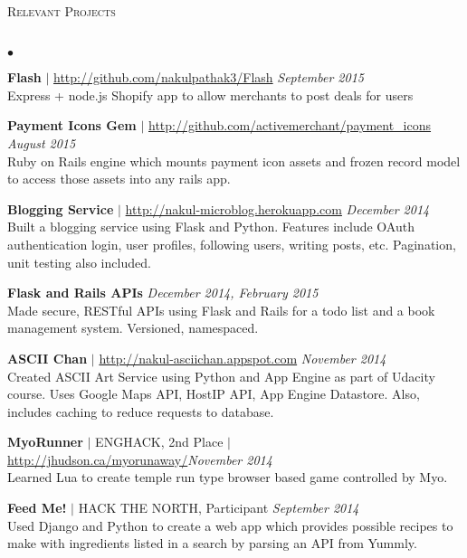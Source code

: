 \documentclass[10pt]{article}
\newcommand{\lineunder}{\vspace*{-8pt} \\ \hspace*{-18pt} \hrulefill \\}
\newcommand{\header}[1]{{\hspace*{-15pt}\vspace*{6pt} \textsc{#1}} \vspace*{-6pt} \lineunder}
\newenvironment{achievements}{\begin{list}{$\bullet$}{\topsep 0pt \itemsep -1.5pt \leftmargin 5pt}}{\vspace*{4pt}\end{list}}
\begin{document}
\vspace{6pt}

\header{\normalsize Relevant Projects}
\begin{achievements}
\def\UrlFont{\em}
\item \textbf{Flash} $|$ \url{http://github.com/nakulpathak3/Flash} \hfill \textit {September 2015}
\\ Express + node.js Shopify app to allow merchants to post deals for users
\item \textbf{Payment Icons Gem} $|$ \url{http://github.com/activemerchant/payment_icons} \hfill \textit {August 2015}
\\ Ruby on Rails engine which mounts payment icon assets and frozen record model to access those assets into any rails app.
\item \textbf{Blogging Service} $|$ \url{http://nakul-microblog.herokuapp.com} \hfill \textit {December 2014}
\\ Built a blogging service using Flask and Python. Features include OAuth authentication login, user profiles, following users, writing posts, etc. Pagination, unit testing also included.
\item \textbf{Flask and Rails APIs}  \hfill \textit {December 2014, February 2015}
\\ Made secure, RESTful APIs using Flask and Rails for a todo list and a book management system. Versioned, namespaced.
\item \textbf{ASCII Chan}  $|$ \url{http://nakul-asciichan.appspot.com} \hfill \textit {November 2014}
\\ Created ASCII Art Service using Python and App Engine as part of Udacity course. Uses Google Maps API, HostIP API, App Engine Datastore. Also, includes caching to reduce requests to database. 
\item\textbf{MyoRunner}  {$|$ \scriptsize ENGHACK, 2nd Place $|$ }  \url{http://jhudson.ca/myorunaway/}\hfill \textit {November 2014}
\\ Learned Lua to create temple run type browser based game controlled by Myo.
\item \textbf{Feed Me!} {$|$ \scriptsize HACK THE NORTH, Participant}  \hfill \textit {September 2014}
\\ Used Django and Python to create a web app which provides possible recipes to make with ingredients listed in a search by parsing an API from Yummly.
\end{achievements}

\vspace{6pt}
\end{document}
